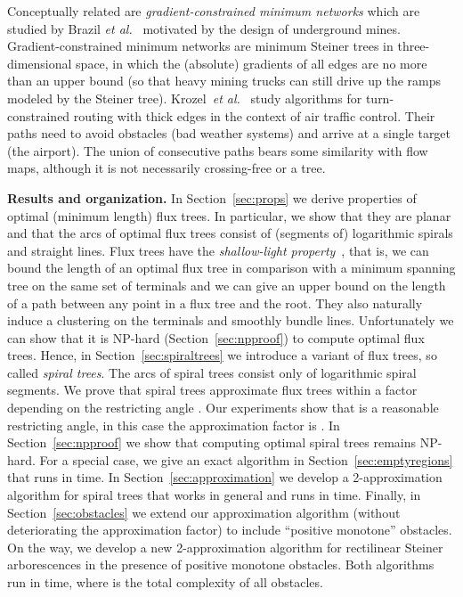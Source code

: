\documentclass{journalA4}
\newcommand{\etal}{{\emph{et al.}\xspace}}
\begin{document}
Conceptually related are \emph{gradient-constrained minimum networks} which are studied by Brazil \etal~\cite{Brazil2001,Brazil2007} motivated by the design of
underground mines. Gradient-constrained minimum networks are minimum Steiner trees in three-dimensional space, in which the (absolute) gradients of all edges are no more than an upper bound  (so that heavy mining trucks can still drive up the ramps modeled by the Steiner tree). Krozel~\etal~\cite{Krozel2006} study algorithms for turn-constrained routing with thick edges in the context of air traffic control. Their paths need to avoid obstacles (bad weather systems) and arrive at a single target (the airport). The union of consecutive paths bears some similarity with flow maps, although it is not necessarily crossing-free or a tree.

\smallskip\noindent
{\bfseries Results and organization.} In Section~\ref{sec:props} we derive properties of optimal (minimum length) flux trees. In particular, we show that they are planar and that the arcs of optimal flux trees consist of (segments of) logarithmic spirals and straight lines.
Flux trees have the \emph{shallow-light property}~\cite{Awerbuch1990}, that is, we can bound the length of an optimal flux tree in comparison with a minimum spanning tree on the same set of terminals and we can give an upper bound on the length of a path between any point in a flux tree and the root.
They also naturally induce a clustering on the terminals and smoothly bundle lines.
Unfortunately we can show
that it is NP-hard (Section~\ref{sec:npproof}) to compute optimal flux trees. Hence, in Section~\ref{sec:spiraltrees} we introduce a variant of flux trees, so called \emph{spiral trees}. The arcs of spiral trees consist only of logarithmic spiral segments. We prove that spiral trees approximate flux trees within a factor depending on the restricting angle . Our experiments show that  is a reasonable restricting angle, in this case the approximation factor is \mbox{}. In Section~\ref{sec:npproof} we show that computing optimal spiral trees remains NP-hard. For a special case, we give an exact algorithm in Section~\ref{sec:emptyregions} that runs in  time. In Section~\ref{sec:approximation} we develop a 2-approximation algorithm for spiral trees that works in general and runs in  time. Finally, in Section~\ref{sec:obstacles} we extend our approximation algorithm (without deteriorating the approximation factor) to include ``positive monotone'' obstacles. On the way, we develop a new 2-approximation algorithm for rectilinear Steiner arborescences in the presence of positive monotone obstacles. Both algorithms run in  time, where  is the total complexity of all obstacles.
\end{document}

